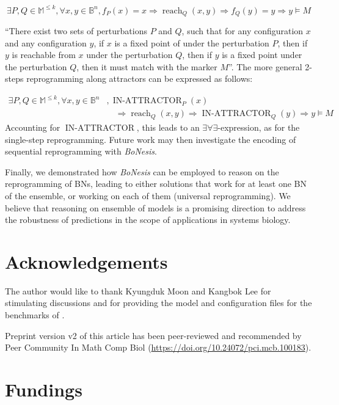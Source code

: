 \documentclass[PCJ,Unicode,screen,mode=plain]{cedram}
\begin{document}
\[\exists P,Q\in\mathbb M^{\leq k}, \forall x,y\in\mathbb B^n,
   f_P(x) = x \Rightarrow
      \operatorname{reach}_Q(x,y) \Rightarrow
      f_Q(y) = y \Rightarrow y\models M\]

``There exist two sets of perturbations \(P\) and \(Q\), such that for
any configuration \(x\) and any configuration \(y\), if \(x\) is a fixed
point of under the perturbation \(P\), then if \(y\) is reachable from
\(x\) under the perturbation \(Q\), then if \(y\) is a fixed point under
the perturbation \(Q\), then it must match with the marker \(M\)''. The
more general 2-steps reprogramming along attractors can be expressed as
follows:

\[
\begin{split}
    \exists P,Q\in\mathbb M^{\leq k}, \forall x,y\in\mathbb B^n&,
\operatorname{IN-ATTRACTOR}_P(x) \\ 
        & \quad
\Rightarrow
     \operatorname{reach}_Q(x,y)  
     \Rightarrow
     \operatorname{IN-ATTRACTOR}_Q(y) \Rightarrow y \models M
 \end{split}
 \]
Accounting for \(\operatorname{IN-ATTRACTOR}\), this leads to an
\(\exists\forall\exists\)-expression, as for the single-step
reprogramming. Future work may then investigate the encoding of
sequential reprogramming with \emph{BoNesis}.

Finally, we demonstrated how \emph{BoNesis} can be employed to reason on
the reprogramming of BNs, leading to either solutions that work for at
least one BN of the ensemble, or working on each of them (universal
reprogramming). We believe that reasoning on ensemble of models is a
promising direction to address the robustness of predictions in the
scope of applications in systems biology.

\section*{Acknowledgements}

The author would like to thank Kyungduk Moon and Kangbok Lee for
stimulating discussions and for providing the model and configuration
files for the benchmarks of \citet{Moon22}.

Preprint version v2 of this article has been peer-reviewed and recommended by Peer Community In
Math Comp Biol (\url{https://doi.org/10.24072/pci.mcb.100183}).

\section*{Fundings}
\end{document}
